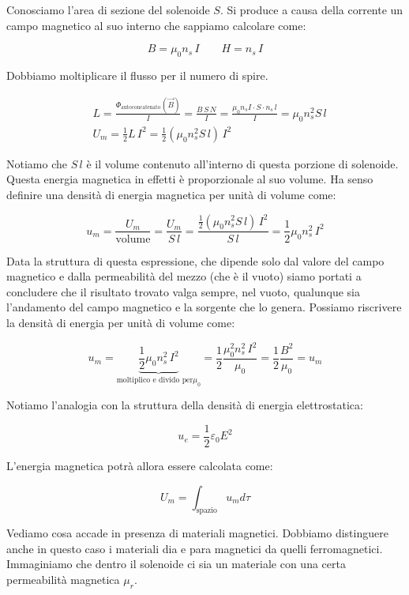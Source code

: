 Conosciamo l'area di sezione del solenoide $S$. Si produce a causa della corrente un campo magnetico al suo interno che sappiamo calcolare come:

\[
	B = \mu_0 n_s\,I \qquad H = n_s\,I
\]

Dobbiamo moltiplicare il flusso per il numero di spire.

\begin{align*}
	&L = \frac{\Phi_{\text{autoconcatenato}}(\vec{B})}{I} = \frac{B\,S\,N}{I} = \frac{\mu_0 n_s I\cdot S \cdot n_s\,l}{I} = \mu_0 n_s^2 S\,l \\
	&\boxed{U_m = \frac{1}{2} L\,I^2} = \frac{1}{2} (\mu_0 n_s^2 S\,l)\,I^2
\end{align*}

Notiamo che $S\,l$ è il volume contenuto all'interno di questa porzione di solenoide. Questa energia magnetica in effetti è proporzionale al suo volume. Ha senso definire una densità di energia magnetica per unità di volume come:

\[
	u_m = \frac{U_m}{\text{volume}} = \frac{U_m}{S\,l} = \frac{\frac{1}{2} (\mu_0 n_s^2 S\,l)\,I^2}{S\,l} = \frac{1}{2} \mu_0 n_s^2\,I^2
\]

Data la struttura di questa espressione, che dipende solo dal valore del campo magnetico e dalla permeabilità del mezzo (che è il vuoto) siamo portati a concludere che il risultato trovato valga sempre, nel vuoto, qualunque sia l'andamento del campo magnetico e la sorgente che lo genera. Possiamo riscrivere la densità di energia per unità di volume come:

\[
	u_m = \underbrace{\frac{1}{2} \mu_0 n_s^2\,I^2}_{\text{moltiplico e divido per}\mu_0} = \frac{1}{2} \frac{\mu_0^2 n_s^2\,I^2}{\mu_0} = \boxed{\frac{1}{2} \frac{B^2}{\mu_0} = u_m}
\]

Notiamo l'analogia con la struttura della densità di energia elettrostatica:

\[
	u_e = \frac{1}{2} \varepsilon_0 E^2
\]

L'energia magnetica potrà allora essere calcolata come:

\[
	U_m = \int_{\text{spazio}} u_m d\tau
\]

Vediamo cosa accade in presenza di materiali magnetici. Dobbiamo distinguere anche in questo caso i materiali dia e para magnetici da quelli ferromagnetici.
Immaginiamo che dentro il solenoide ci sia un materiale con una certa permeabilità magnetica $\mu_r$.

